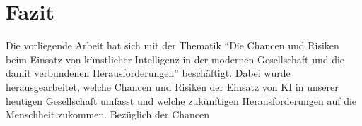 \newpage
\section{Fazit}\label{Fazit}
Die vorliegende Arbeit hat sich mit der Thematik \enquote{Die Chancen und Risiken beim Einsatz von künstlicher Intelligenz in der modernen Gesellschaft und die damit verbundenen Herausforderungen}
beschäftigt. Dabei wurde herausgearbeitet, welche Chancen und Risiken der Einsatz von \ac{KI} in unserer heutigen Gesellschaft umfasst und welche zukünftigen Herausforderungen
auf die Menschheit zukommen.
Bezüglich der Chancen 